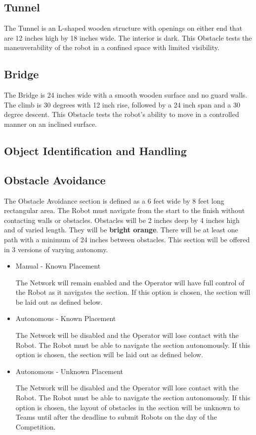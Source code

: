 \subsection{Tunnel}
The Tunnel is an L-shaped wooden structure with openings on either end that are 12 inches high by 18 inches wide. The interior is dark. This Obstacle tests the maneuverability of the robot in a confined space with limited visibility.

\subsection{Bridge}
The Bridge is 24 inches wide with a smooth wooden surface and no guard walls. The climb is 30 degrees with 12 inch rise, followed by a 24 inch span and a 30 degree descent. This Obstacle tests the robot’s ability to move in a controlled manner on an inclined surface.

\subsection{Object Identification and Handling}


\subsection{Obstacle Avoidance}
The Obstacle Avoidance section is defined as a 6 feet wide by 8 feet long rectangular area. The Robot must navigate from the start to the finish without contacting walls or obstacles. Obstacles will be 2 inches deep by 4 inches high and of varied length. They will be \textbf{bright orange}. There will be at least one path with a minimum of 24 inches between obstacles. This section will be offered in 3 versions of varying autonomy.

\begin{itemize}
    \item Manual - Known Placement
    
        The Network will remain enabled and the Operator will have full control of the Robot as it navigates the section. If this option is chosen, the section will be laid out as defined below.
    \item Autonomous - Known Placement
    
        The Network will be disabled and the Operator will lose contact with the Robot. The Robot must be able to navigate the section autonomously. If this option is chosen, the section will be laid out as defined below.
    \item Autonomous - Unknown Placement
    
        The Network will be disabled and the Operator will lose contact with the Robot. The Robot must be able to navigate the section autonomously. If this option is chosen, the layout of obstacles in the section will be unknown to Teams until after the deadline to submit Robots on the day of the Competition. 
        
\end{itemize}